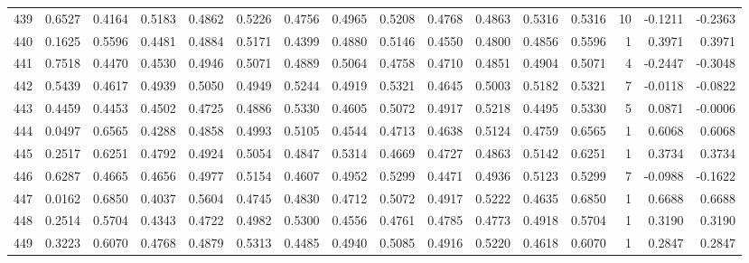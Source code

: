 \begin{tabular}{lrrrrrrrrrrrrrrr}
439 &      0.6527 &  0.4164 &  0.5183 &  0.4862 &  0.5226 &  0.4756 &  0.4965 &  0.5208 &  0.4768 &  0.4863 &   0.5316 &     0.5316 &     10 &                   -0.1211 &                    -0.2363 \\
440 &      0.1625 &  0.5596 &  0.4481 &  0.4884 &  0.5171 &  0.4399 &  0.4880 &  0.5146 &  0.4550 &  0.4800 &   0.4856 &     0.5596 &      1 &                    0.3971 &                     0.3971 \\
441 &      0.7518 &  0.4470 &  0.4530 &  0.4946 &  0.5071 &  0.4889 &  0.5064 &  0.4758 &  0.4710 &  0.4851 &   0.4904 &     0.5071 &      4 &                   -0.2447 &                    -0.3048 \\
442 &      0.5439 &  0.4617 &  0.4939 &  0.5050 &  0.4949 &  0.5244 &  0.4919 &  0.5321 &  0.4645 &  0.5003 &   0.5182 &     0.5321 &      7 &                   -0.0118 &                    -0.0822 \\
443 &      0.4459 &  0.4453 &  0.4502 &  0.4725 &  0.4886 &  0.5330 &  0.4605 &  0.5072 &  0.4917 &  0.5218 &   0.4495 &     0.5330 &      5 &                    0.0871 &                    -0.0006 \\
444 &      0.0497 &  0.6565 &  0.4288 &  0.4858 &  0.4993 &  0.5105 &  0.4544 &  0.4713 &  0.4638 &  0.5124 &   0.4759 &     0.6565 &      1 &                    0.6068 &                     0.6068 \\
445 &      0.2517 &  0.6251 &  0.4792 &  0.4924 &  0.5054 &  0.4847 &  0.5314 &  0.4669 &  0.4727 &  0.4863 &   0.5142 &     0.6251 &      1 &                    0.3734 &                     0.3734 \\
446 &      0.6287 &  0.4665 &  0.4656 &  0.4977 &  0.5154 &  0.4607 &  0.4952 &  0.5299 &  0.4471 &  0.4936 &   0.5123 &     0.5299 &      7 &                   -0.0988 &                    -0.1622 \\
447 &      0.0162 &  0.6850 &  0.4037 &  0.5604 &  0.4745 &  0.4830 &  0.4712 &  0.5072 &  0.4917 &  0.5222 &   0.4635 &     0.6850 &      1 &                    0.6688 &                     0.6688 \\
448 &      0.2514 &  0.5704 &  0.4343 &  0.4722 &  0.4982 &  0.5300 &  0.4556 &  0.4761 &  0.4785 &  0.4773 &   0.4918 &     0.5704 &      1 &                    0.3190 &                     0.3190 \\
449 &      0.3223 &  0.6070 &  0.4768 &  0.4879 &  0.5313 &  0.4485 &  0.4940 &  0.5085 &  0.4916 &  0.5220 &   0.4618 &     0.6070 &      1 &                    0.2847 &                     0.2847 \\

\end{tabular}

